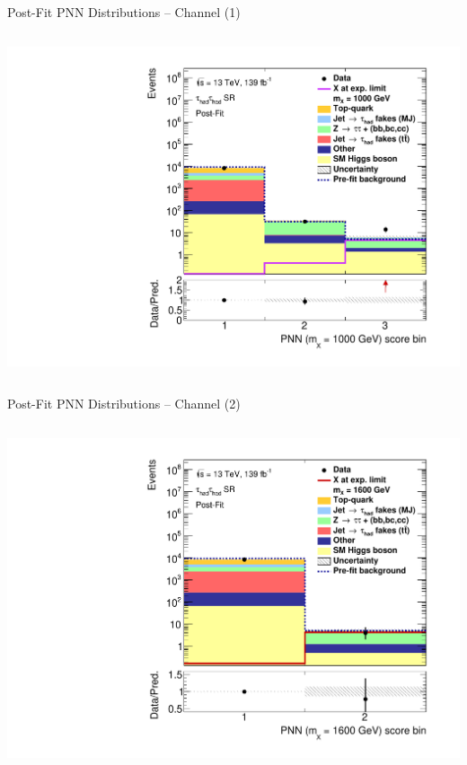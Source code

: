 \documentclass[11pt, xcolor={dvipsnames}, aspectratio=169, notes]{beamer}
\begin{document}
\begin{frame}{Post-Fit PNN Distributions -- \allbold{\hadhad} Channel (1)}
\begin{columns}
    \centering


    \includegraphics[width=\textwidth]{results_res/postfit/Region_BMin0_incJet1_distPNN1000_J2_Y2015_DLLOS_T2_SpcTauHH_L0_GlobalFit_conditionnal_mu0log}
  \end{columns}
\end{frame}


\begin{frame}{Post-Fit PNN Distributions -- \allbold{\hadhad} Channel (2)}
  \begin{columns}
    \centering


    \includegraphics[width=\textwidth]{results_res/postfit/Region_BMin0_incJet1_distPNN1600_J2_Y2015_DLLOS_T2_SpcTauHH_L0_GlobalFit_conditionnal_mu0log}

  \end{columns}
\end{frame}
\end{document}
